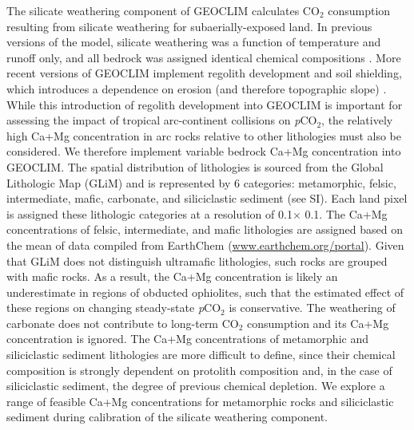 \documentclass[9pt,twocolumn,twoside,lineno]{pnas-new}
\newcommand{\degrees}{\textdegree\xspace}
\newcommand{\pCOtwo}{\textit{p}CO$_{2}$\xspace}
\newcommand{\COtwo}{CO$_{2}$\xspace}
\begin{document}
The silicate weathering component of GEOCLIM calculates \COtwo consumption resulting from silicate weathering for subaerially-exposed land. In previous versions of the model, silicate weathering was a function of temperature and runoff only, and all bedrock was assigned identical chemical compositions \cite{Godderis2017c}. More recent versions of GEOCLIM implement regolith development and soil shielding, which introduces a dependence on erosion (and therefore topographic slope) \cite{Maffre2018a}. While this introduction of regolith development into GEOCLIM is important for assessing the impact of tropical arc-continent collisions on \pCOtwo, the relatively high Ca+Mg concentration in arc rocks relative to other lithologies must also be considered. We therefore implement variable bedrock Ca+Mg concentration into GEOCLIM. The spatial distribution of lithologies is sourced from the Global Lithologic Map (GLiM) \cite{Hartmann2012a} and is represented by 6 categories: metamorphic, felsic, intermediate, mafic, carbonate, and siliciclastic sediment (see SI). Each land pixel is assigned these lithologic categories at a resolution of 0.1\degrees $\times$ 0.1\degrees. The Ca+Mg concentrations of felsic, intermediate, and mafic lithologies are assigned based on the mean of data compiled from EarthChem (\url{www.earthchem.org/portal}). Given that GLiM does not distinguish ultramafic lithologies, such rocks are grouped with mafic rocks. As a result, the Ca+Mg concentration is likely an underestimate in regions of obducted ophiolites, such that the estimated effect of these regions on changing steady-state \pCOtwo is conservative. The weathering of carbonate does not contribute to long-term \COtwo consumption and its Ca+Mg concentration is ignored. The Ca+Mg concentrations of metamorphic and siliciclastic sediment lithologies are more difficult to define, since their chemical composition is strongly dependent on protolith composition and, in the case of siliciclastic sediment, the degree of previous chemical depletion. We explore a range of feasible Ca+Mg concentrations for metamorphic rocks and siliciclastic sediment during calibration of the silicate weathering component.
\end{document}
